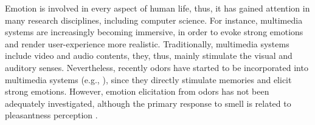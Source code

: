 %




Emotion is involved in every aspect of human life, thus, it has gained attention in many research disciplines, including computer science. For instance, multimedia systems are increasingly becoming immersive, in order to evoke strong emotions and render user-experience more realistic. Traditionally, multimedia systems include video and audio contents, they, thus, mainly stimulate the visual and auditory senses. Nevertheless, recently odors have started to be incorporated into multimedia systems (e.g., \cite{nakamoto2011olfactory,nakamoto2008cooking,richard2006multi}), since they directly stimulate memories and elicit strong emotions. However, emotion elicitation from odors has not been adequately investigated, although the primary response to smell is related to pleasantness perception \cite{gulas1995right}. 


